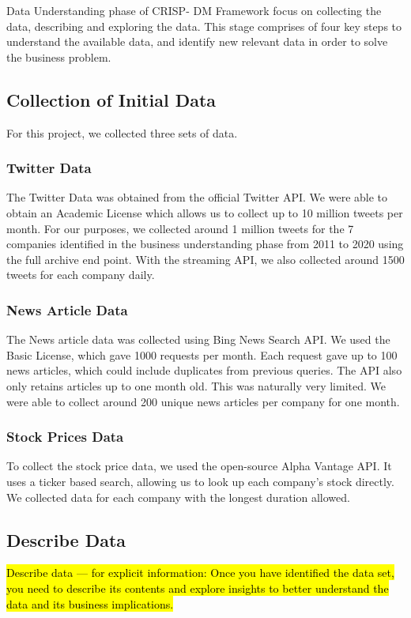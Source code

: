 \documentclass[sigconf, nonacm]{acmart}
\begin{document}
Data Understanding phase of CRISP- DM Framework focus on collecting the data, describing and exploring the data.
This stage comprises of four key steps to understand the available data, and identify new relevant data in order to solve the business problem. 




\subsection{Collection of Initial Data} %
For this project, we collected three sets of data.

\subsubsection{Twitter Data}
The Twitter Data was obtained from the official Twitter API. We were able to obtain an Academic License which allows us to collect up to 10 million tweets per month. For our purposes, we collected around 1 million tweets for the 7 companies identified in the business understanding phase from 2011 to 2020 using the full archive end point. With the streaming API, we also collected around 1500 tweets for each company daily.

\subsubsection{News Article Data}
The News article data was collected using Bing News Search API. We used the Basic License, which gave 1000 requests per month. Each request gave up to 100 news articles, which could include duplicates from previous queries. The API also only retains articles up to one month old. This was naturally very limited. We were able to collect around 200 unique news articles per company for one month.

\subsubsection{Stock Prices Data}
To collect the stock price data, we used the open-source Alpha Vantage API. It uses a ticker based search, allowing us to look up each company's stock directly. We collected data for each company with the longest duration allowed.
\subsection{Describe Data} %
\hl{Describe data — for explicit information: Once you have identified the data set, you need to describe its contents and explore insights to better understand the data and its business implications.}
\end{document}
